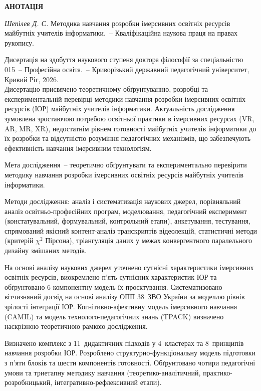 \begin{center}
{\large \textbf{АНОТАЦІЯ}}
\end{center}

\textit{Шепілев Д. С.} Методика навчання розробки імерсивних освітніх ресурсів майбутніх учителів інформатики.~-- Кваліфікаційна наукова праця на правах рукопису.

Дисертація на здобуття наукового ступеня доктора філософії за спеціальністю 015~-- Професійна освіта.~-- Криворізький державний педагогічний університет, Кривий Ріг, 2026.\\

Дисертацію присвячено теоретичному обґрунтуванню, розробці та експериментальній перевірці методики навчання розробки імерсивних освітніх ресурсів (ІОР) майбутніх учителів інформатики. Актуальність дослідження зумовлена зростаючою потребою освітньої практики в імерсивних ресурсах (VR, AR, MR, XR), недостатнім рівнем готовності майбутніх учителів інформатики до їх розробки та відсутністю розуміння педагогічних механізмів, що забезпечують ефективність навчання імерсивним технологіям.

Мета дослідження~-- теоретично обґрунтувати та експериментально перевірити методику навчання розробки імерсивних освітніх ресурсів майбутніх учителів інформатики.

Методи дослідження: аналіз і систематизація наукових джерел, порівняльний аналіз освітньо-професійних програм, моделювання, педагогічний експеримент (констатувальний, формувальний, контрольний етапи), анкетування, тестування, спрямований якісний контент-аналіз транскриптів відеолекцій, статистичні методи (критерій $\chi^2$ Пірсона), тріангуляція даних у межах конвергентного паралельного дизайну змішаних методів.

На основі аналізу наукових джерел уточнено сутнісні характеристики імерсивних освітніх ресурсів, виокремлено п'ять сутнісних характеристик ІОР та обґрунтовано 6-компонентну модель їх проєктування. Систематизовано вітчизняний досвід на основі аналізу ОПП 38~ЗВО України за моделлю рівнів зрілості інтеграції ІОР. Когнітивно-афективну модель імерсивного навчання (CAMIL) та модель технолого-педагогічних знань (TPACK) визначено наскрізною теоретичною рамкою дослідження.

Визначено комплекс з 11~дидактичних підходів у 4~кластерах та 8~принципів навчання розробки ІОР. Розроблено структурно-функціональну модель підготовки з п'яти блоків та шести компонентів готовності. Обґрунтовано чотири педагогічні умови та триетапну методику навчання (теоретико-аналітичний, практико-розробницький, інтегративно-рефлексивний етапи).

